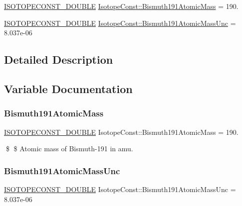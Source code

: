 \begin{DoxyCompactItemize}
\item 
\mbox{\hyperlink{group___isotope_const-_macros_ga8f45a7272ce02c0b4c65c44636ed719a}{I\+S\+O\+T\+O\+P\+E\+C\+O\+N\+S\+T\+\_\+\+D\+O\+U\+B\+LE}} \mbox{\hyperlink{group___isotope_const-_bismuth-_bi191_ga36e2715de9288ce5cdfc5ddc7b5cb00b}{Isotope\+Const\+::\+Bismuth191\+Atomic\+Mass}} = 190.
\item 
\mbox{\hyperlink{group___isotope_const-_macros_ga8f45a7272ce02c0b4c65c44636ed719a}{I\+S\+O\+T\+O\+P\+E\+C\+O\+N\+S\+T\+\_\+\+D\+O\+U\+B\+LE}} \mbox{\hyperlink{group___isotope_const-_bismuth-_bi191_gad9cfb7b67c29975e2a1e0f1d4c394862}{Isotope\+Const\+::\+Bismuth191\+Atomic\+Mass\+Unc}} = 8.\+037e-\/06
\end{DoxyCompactItemize}


\subsection{Detailed Description}


\subsection{Variable Documentation}
\mbox{\label{group___isotope_const-_bismuth-_bi191_ga36e2715de9288ce5cdfc5ddc7b5cb00b}} 
\subsubsection{\texorpdfstring{Bismuth191\+Atomic\+Mass}{Bismuth191AtomicMass}}
{\footnotesize\ttfamily \mbox{\hyperlink{group___isotope_const-_macros_ga8f45a7272ce02c0b4c65c44636ed719a}{I\+S\+O\+T\+O\+P\+E\+C\+O\+N\+S\+T\+\_\+\+D\+O\+U\+B\+LE}} Isotope\+Const\+::\+Bismuth191\+Atomic\+Mass = 190.}

\$ \$ Atomic mass of Bismuth-\/191 in amu. \mbox{\label{group___isotope_const-_bismuth-_bi191_gad9cfb7b67c29975e2a1e0f1d4c394862}} 
\subsubsection{\texorpdfstring{Bismuth191\+Atomic\+Mass\+Unc}{Bismuth191AtomicMassUnc}}
{\footnotesize\ttfamily \mbox{\hyperlink{group___isotope_const-_macros_ga8f45a7272ce02c0b4c65c44636ed719a}{I\+S\+O\+T\+O\+P\+E\+C\+O\+N\+S\+T\+\_\+\+D\+O\+U\+B\+LE}} Isotope\+Const\+::\+Bismuth191\+Atomic\+Mass\+Unc = 8.\+037e-\/06}


